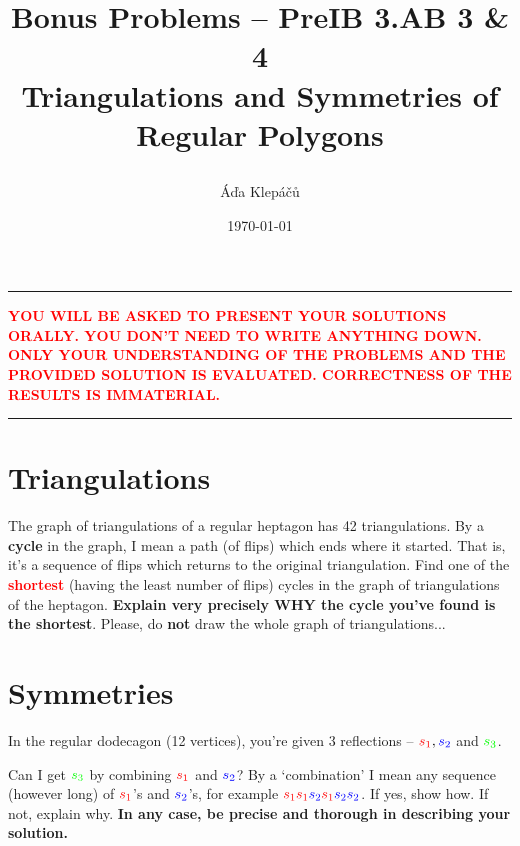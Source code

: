 \documentclass[a4paper,11pt]{article}
\title{\Huge\textsf{Bonus Problems -- PreIB 3.AB 3 \& 4}\\
 \Large\textsf{Triangulations and Symmetries of Regular Polygons}
 \author{Áďa Klepáčů}
 \date{\today}
}
\newcommand{\clr}{\textcolor{red}}
\newcommand{\clb}{\textcolor{blue}}
\newcommand{\clg}{\textcolor{green}}
\begin{document}
\maketitle
\thispagestyle{fancy}

\hrule
\textbf{\footnotesize \clr{\uppercase{You will be asked to present your
solutions orally. You don't need to write anything down. Only your
understanding of the problems and the provided solution is evaluated.
Correctness of the results is immaterial.}}}
\vspace{2ex}
\hrule
 
\section*{Triangulations}

The graph of triangulations of a regular heptagon has 42 triangulations. By a
\textbf{cycle} in the graph, I mean a path (of flips) which ends where it
started. That is, it's a sequence of flips which returns to the original
triangulation. Find one of the \clr{\textbf{shortest}} (having the least number
of flips) cycles in the graph of triangulations of the heptagon. \textbf{Explain
very precisely WHY the cycle you've found is the shortest}. Please, do
\textbf{not} draw the whole graph of triangulations...
\clearpage

\section*{Symmetries}
In the regular dodecagon (12 vertices), you're given 3 reflections --
$\clr{s_1}, \clb{s_2}$ and $\clg{s_3}$.
\begin{center}
\end{center}
Can I get $\clg{s_3}$ by combining $\clr{s_1}$ and $\clb{s_2}$? By a
`combination' I mean any sequence (however long) of $\clr{s_1}$'s and
$\clb{s_2}$'s, for example $\clr{s_1s_1}\clb{s_2}\clr{s_1}\clb{s_2}\clb{s_2}$.
If yes, show how. If not, explain why. \textbf{In any case, be precise and
thorough in describing your solution.}
\end{document}
